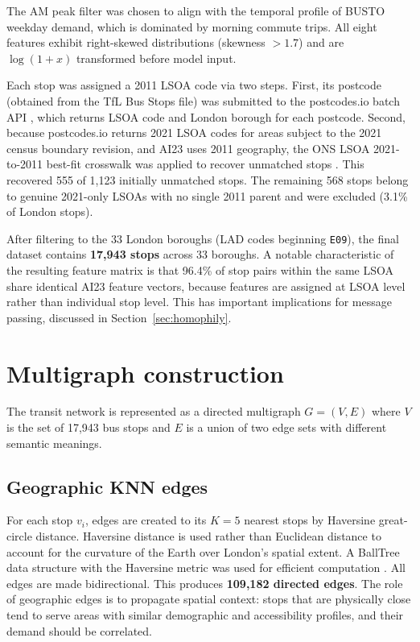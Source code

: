 \documentclass[12pt,a4paper]{report}
\begin{document}
The AM peak filter was chosen to align with the temporal profile of BUSTO
weekday demand, which is dominated by morning commute trips. All eight features
exhibit right-skewed distributions (skewness $> 1.7$) and are $\log(1+x)$
transformed before model input.

Each stop was assigned a 2011 LSOA code via two steps. First, its postcode
(obtained from the TfL Bus Stops file) was submitted to the postcodes.io batch
API \citep{postcodesio}, which returns LSOA code and London borough for each
postcode. Second, because postcodes.io returns 2021 LSOA codes for areas
subject to the 2021 census boundary revision, and AI23 uses 2011 geography,
the ONS LSOA 2021-to-2011 best-fit crosswalk was applied to recover unmatched
stops \citep{ons2022crosswalk}. This recovered 555 of 1,123 initially
unmatched stops. The remaining 568 stops belong to genuine 2021-only LSOAs
with no single 2011 parent and were excluded (3.1\% of London stops).

After filtering to the 33 London boroughs (LAD codes beginning \texttt{E09}),
the final dataset contains \textbf{17,943 stops} across 33 boroughs. A notable
characteristic of the resulting feature matrix is that 96.4\% of stop pairs
within the same LSOA share identical AI23 feature vectors, because features
are assigned at LSOA level rather than individual stop level. This has
important implications for message passing, discussed in
Section~\ref{sec:homophily}.

\section{Multigraph construction}
\label{sec:multigraph}
The transit network is represented as a directed multigraph $G = (V, E)$ where
$V$ is the set of 17,943 bus stops and $E$ is a union of two edge sets with
different semantic meanings.

\subsection{Geographic KNN edges}
For each stop $v_i$, edges are created to its $K=5$ nearest stops by Haversine
great-circle distance. Haversine distance is used rather than Euclidean
distance to account for the curvature of the Earth over London's spatial
extent. A BallTree data structure with the Haversine metric was used for
efficient computation \citep{scikit2011}. All edges are made bidirectional.
This produces \textbf{109,182 directed edges}. The role of geographic edges is
to propagate spatial context: stops that are physically close tend to serve
areas with similar demographic and accessibility profiles, and their demand
should be correlated.
\end{document}
